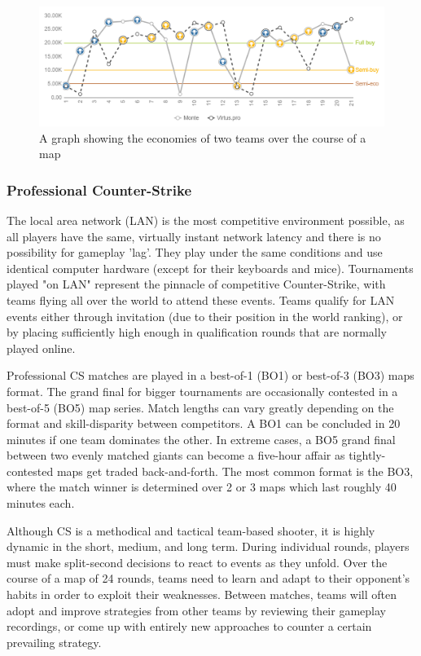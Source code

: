 \begin{figure}[h]
	\centering
	\includegraphics[width=\textwidth]{Figures/economy.png}
	\caption{A graph showing the economies of two teams over the course of a map \cite{vpmatch}}
	\label{fig:economy}
\end{figure}


\subsubsection{Professional Counter-Strike}

The local area network (LAN) is the most competitive environment possible, as all players have the same, virtually instant network latency and there is no possibility for gameplay 'lag'. They play under the same conditions and use identical computer hardware (except for their keyboards and mice). Tournaments played "on LAN" represent the pinnacle of competitive Counter-Strike, with teams flying all over the world to attend these events. Teams qualify for LAN events either through invitation (due to their position in the world ranking), or by placing sufficiently high enough in qualification rounds that are normally played online.

Professional CS matches are played in a best-of-1 (BO1) or best-of-3 (BO3) maps format. The grand final for bigger tournaments are occasionally contested in a best-of-5 (BO5) map series. Match lengths can vary greatly depending on the format and skill-disparity between competitors. A BO1 can be concluded in 20 minutes if one team dominates the other. In extreme cases, a BO5 grand final between two evenly matched giants can become a five-hour affair as tightly-contested maps get traded back-and-forth. The most common format is the BO3, where the match winner is determined over 2 or 3 maps which last roughly 40 minutes each.

Although CS is a methodical and tactical team-based shooter, it is highly dynamic in the short, medium, and long term. During individual rounds, players must make split-second decisions to react to events as they unfold. Over the course of a map of 24 rounds, teams need to learn and adapt to their opponent's habits in order to exploit their weaknesses. Between matches, teams will often adopt and improve strategies from other teams by reviewing their gameplay recordings, or come up with entirely new approaches to counter a certain prevailing strategy.

